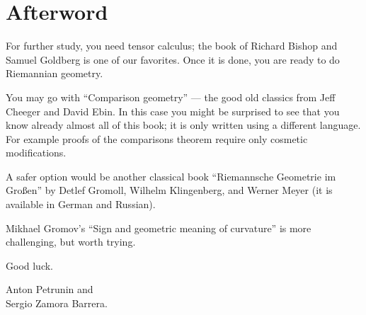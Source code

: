 \chapter*{Afterword}



For further study, you need tensor calculus; the book of Richard Bishop and Samuel Goldberg \cite{bishop-goldberg} is one of our favorites.
Once it is done, you are ready to do Riemannian geometry.

You may go with  ``Comparison geometry'' \cite{cheeger-ebin} --- the good old classics from Jeff Cheeger and David Ebin. 
In this case you might be surprised to see that you know already almost all of this book;
it is only written using a different language.
For example proofs of the comparisons theorem require only cosmetic modifications.

A safer option would be another classical book ``Riemannsche Geometrie im Großen'' \cite{gromoll-klingenberg-meyer} by 
Detlef Gromoll,
Wilhelm Klingenberg, 
and  Werner Meyer (it is available in German and Russian).

Mikhael Gromov's ``Sign and geometric meaning of curvature'' \cite{gromov-1991} is more challenging, but worth trying. 

Good luck.

\begin{flushright}
Anton Petrunin and\\
Sergio Zamora Barrera.
\end{flushright}
